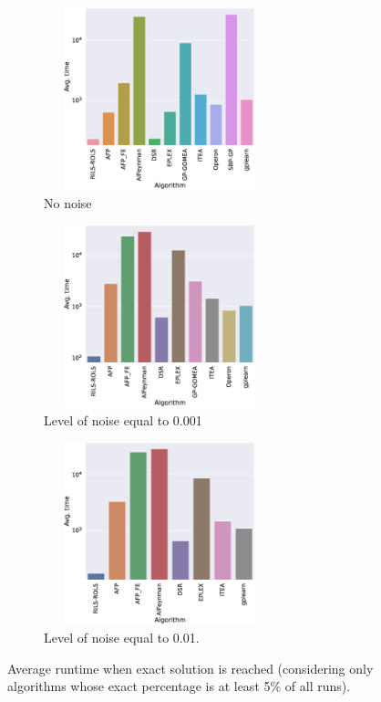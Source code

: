 \documentclass{bmcart}
\begin{document}
\begin{figure}[!h]
	
	
	\begin{subfigure}[b]{0.45\textwidth}
		\includegraphics[width=190pt,height=150pt]{plots/time-avg-noise0.0.eps}
		\caption{No noise}
		\label{fig:noNoise-time}
	\end{subfigure}
	\hfill
	\begin{subfigure}[b]{0.47\textwidth}
		
		\includegraphics[width=190pt,height=150pt]{plots/time-avg-noise0.001.eps}
		\caption{Level of noise equal to 0.001}
		\label{fig:noise0.001-time}
	\end{subfigure}
	\centering
	\begin{subfigure}[b]{0.47\textwidth}
		\includegraphics[width=190pt,height=150pt]{plots/time-avg-noise0.01.eps}
		\caption{Level of noise equal to 0.01.}
		\label{fig:noise0.01-time}
	\end{subfigure}
	\caption{Average runtime when exact solution is reached (considering only algorithms whose exact percentage is at least 5\% of all runs).}
	\label{fig:time-avg-exact-noise}
\end{figure}
\end{document}
